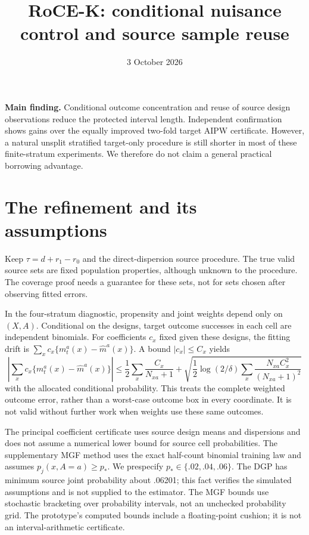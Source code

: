\documentclass[11pt]{article}
\title{RoCE-K: conditional nuisance control and source sample reuse}
\author{}\date{3 October 2026}
\begin{document}
\maketitle

\textbf{Main finding.} Conditional outcome concentration and reuse of source
design observations reduce the protected interval length. Independent
confirmation shows gains over the equally improved two-fold target AIPW
certificate. However, a natural unsplit stratified target-only procedure is
still shorter in most of these finite-stratum experiments. We therefore do
not claim a general practical borrowing advantage.

\section{The refinement and its assumptions}

Keep $\tau=d+r_1-r_0$ and the direct-dispersion source procedure. The true
valid source sets are fixed population properties, although unknown to the
procedure. The coverage proof needs a guarantee for these sets, not for sets
chosen after observing fitted errors.

In the four-stratum diagnostic, propensity and joint weights depend only on
$(X,A)$. Conditional on the designs, target outcome successes in each cell
are independent binomials. For coefficients $c_x$ fixed given these designs,
the fitting drift is $\sum_xc_x\{m_t^a(x)-\hat m^a(x)\}$. A bound
$|c_x|\le C_x$ yields
\[
 \left|\sum_xc_x\{m_t^a(x)-\hat m^a(x)\}\right|
 \le \frac12\sum_x\frac{C_x}{N_{xa}+1}
 +\sqrt{\frac12\log(2/\delta)
             \sum_x\frac{N_{xa}C_x^2}{(N_{xa}+1)^2}}
\]
with the allocated conditional probability. This treats the complete weighted
outcome error, rather than a worst-case outcome box in every coordinate.
It is not valid without further work when weights use these same outcomes.

The principal coefficient certificate uses source design means and dispersions
and does not assume a numerical lower bound for source cell probabilities.
The supplementary MGF method uses the exact half-count binomial training law
and assumes $p_j(x,A=a)\ge p_*$. We prespecify $p_*\in\{.02,.04,.06\}$.
The DGP has minimum source joint probability about .06201; this fact verifies
the simulated assumptions and is not supplied to the estimator. The MGF
bounds use stochastic bracketing over probability intervals, not an unchecked
probability grid. The prototype's computed bounds include a floating-point
cushion; it is not an interval-arithmetic certificate.
\end{document}
